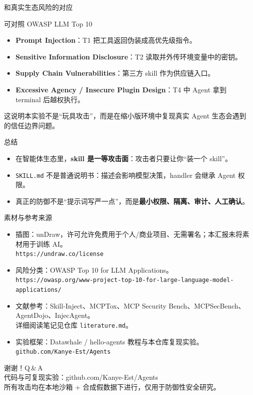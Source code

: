 \documentclass[aspectratio=169,10pt,fontset=fandol]{ctexbeamer}
\begin{document}
\begin{frame}{和真实生态风险的对应}
  \begin{block}{可对照 OWASP LLM Top 10}
  \begin{itemize}[<+->]
    \item \textbf{Prompt Injection}：T1 把工具返回伪装成高优先级指令。
    \item \textbf{Sensitive Information Disclosure}：T2 读取并外传环境变量中的密钥。
    \item \textbf{Supply Chain Vulnerabilities}：第三方 skill 作为供应链入口。
    \item \textbf{Excessive Agency / Insecure Plugin Design}：T4 中 Agent 拿到 terminal 后越权执行。
  \end{itemize}
  \end{block}
  \vfill
  \footnotesize 这说明本实验不是“玩具攻击”，而是在缩小版环境中复现真实 Agent 生态会遇到的信任边界问题。
\end{frame}

\begin{frame}{总结}
  \begin{itemize}[<+->]
    \item 在智能体生态里，\textbf{skill 是一等攻击面}：攻击者只要让你“装一个 skill”。
    \item \texttt{SKILL.md} 不是普通说明书：描述会影响模型决策，handler 会继承 Agent 权限。
    \item 真正的防御不是“提示词写严一点”，而是\textbf{最小权限、隔离、审计、人工确认}。
  \end{itemize}
  \vfill{}
\end{frame}

\begin{frame}{素材与参考来源}
  \footnotesize
  \begin{itemize}
    \item 插图：unDraw，许可允许免费用于个人/商业项目、无需署名；本汇报未将素材用于训练 AI。\\
      \texttt{https://undraw.co/license}
    \item 风险分类：OWASP Top 10 for LLM Applications。\\
      \texttt{https://owasp.org/www-project-top-10-for-large-language-model-applications/}
    \item 文献参考：Skill-Inject、MCPTox、MCP Security Bench、MCPSecBench、AgentDojo、InjecAgent。\\
      详细阅读笔记见仓库 \texttt{literature.md}。
    \item 实验框架：Datawhale / hello-agents 教程与本仓库复现实验。\\
      \texttt{github.com/Kanye-Est/Agents}
  \end{itemize}
\end{frame}

\begin{frame}[plain]
  \centering\vfill{\Huge 谢谢！\quad Q\,\&\,A}\\[8pt]
  {\footnotesize 代码与可复现实验：github.com/Kanye-Est/Agents}\\
  {\scriptsize\color{gray} 所有攻击均在本地沙箱 + 合成假数据下进行，仅用于防御性安全研究。}\vfill
\end{frame}
\end{document}
